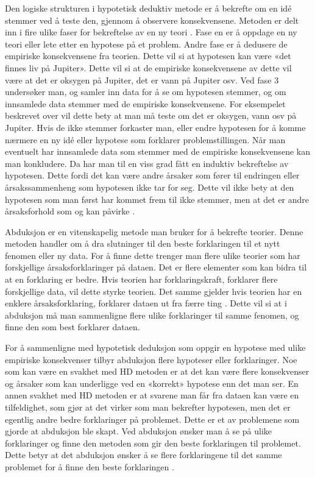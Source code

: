 \documentclass[
]{book}
\begin{document}
Den logiske strukturen i hypotetisk deduktiv metode er å bekrefte om en idé stemmer ved å teste den, gjennom å observere konsekvensene. Metoden er delt inn i fire ulike faser for bekreftelse av en ny teori \citep{dellsén2021}. Fase en er å oppdage en ny teori eller lete etter en hypotese på et problem. Andre fase er å dedusere de empiriske konsekvensene fra teorien. Dette vil si at hypotesen kan være «det finnes liv på Jupiter». Dette vil si at de empiriske konsekvensene av dette vil være at det er oksygen på Jupiter, det er vann på Jupiter osv. Ved fase 3 undersøker man, og samler inn data for å se om hypotesen stemmer, og om innsamlede data stemmer med de empiriske konsekvensene. For eksempelet beskrevet over vil dette bety at man må teste om det er oksygen, vann osv på Jupiter. Hvis de ikke stemmer forkaster man, eller endre hypotesen for å komme nærmere en ny idé eller hypotese som forklarer problemstillingen. Når man eventuelt har innsamlede data som stemmer med de empiriske konsekvensene kan man konkludere. Da har man til en viss grad fått en induktiv bekreftelse av hypotesen. Dette fordi det kan være andre årsaker som fører til endringen eller årsakssammenheng som hypotesen ikke tar for seg. Dette vil ikke bety at den hypotesen som man først har kommet frem til ikke stemmer, men at det er andre årsaksforhold som og kan påvirke \citep{hempel1966}.

Abduksjon er en vitenskapelig metode man bruker for å bekrefte teorier. Denne metoden handler om å dra slutninger til den beste forklaringen til et nytt fenomen eller ny data. For å finne dette trenger man flere ulike teorier som har forskjellige årsaksforklaringer på dataen. Det er flere elementer som kan bidra til at en forklaring er bedre. Hvis teorien har forklaringskraft, forklarer flere forskjellige data, vil dette styrke teorien. Det samme gjelder hvis teorien har en enklere årsaksforklaring, forklarer dataen ut fra færre ting \citep{dellsén2021}. Dette vil si at i abduksjon må man sammenligne flere ulike forklaringer til samme fenomen, og finne den som best forklarer dataen.

For å sammenligne med hypotetisk deduksjon som oppgir en hypotese med ulike empiriske konsekvenser tilbyr abduksjon flere hypoteser eller forklaringer. Noe som kan være en svakhet med HD metoden er at det kan være flere konsekvenser og årsaker som kan underligge ved en «korrekt» hypotese enn det man ser. En annen svakhet med HD metoden er at svarene man får fra dataen kan være en tilfeldighet, som gjør at det virker som man bekrefter hypotesen, men det er egentlig andre bedre forklaringer på problemet. Dette er et av problemene som gjorde at abduksjon ble skapt. Ved abduksjon ønsker man å se på ulike forklaringer og finne den metoden som gir den beste forklaringen til problemet. Dette betyr at det abduksjon ønsker å se flere forklaringene til det samme problemet for å finne den beste forklaringen \citep{dellsén2021}.
\end{document}
